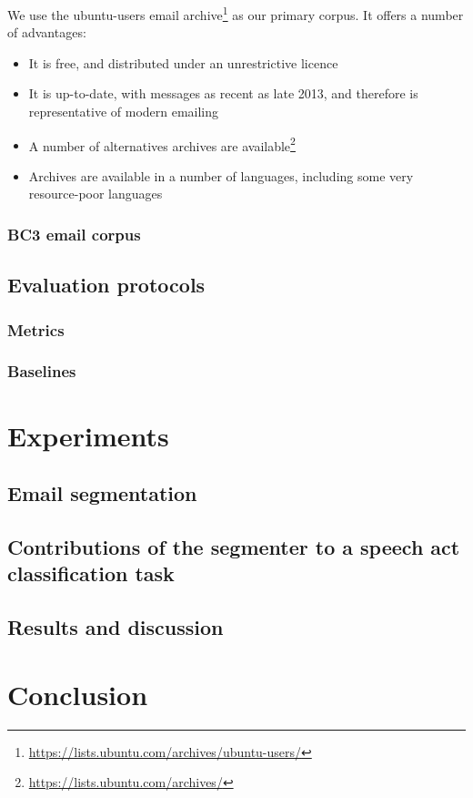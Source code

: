 \documentclass[11pt]{article}
\begin{document}
We use the ubuntu-users email archive\footnote{\url{https://lists.ubuntu.com/archives/ubuntu-users/}} as our primary corpus. It offers a number of advantages:

\begin{itemize}
    \item It is free, and distributed under an unrestrictive licence
    \item It is up-to-date, with messages as recent as late 2013, and therefore is representative of modern emailing
    \item A number of alternatives archives are available\footnote{\url{https://lists.ubuntu.com/archives/}}
    \item Archives are available in a number of languages, including some very resource-poor languages
\end{itemize}

\subsubsection{BC3 email corpus}

\subsection{Evaluation protocols}

\subsubsection{Metrics}

\subsubsection{Baselines}

\section{Experiments}

\subsection{Email segmentation}

\subsection{Contributions of the segmenter to a speech act classification task}

\subsection{Results and discussion}

\section{Conclusion}



\end{document}
